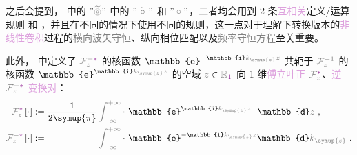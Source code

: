 之后会提到， 中的 $"\mathcolor{gray}{\widetilde \circledcirc}"$ 中的 $"~\mathcolor{gray}{\widetilde \circ}~"$ 和 $"\mathcolor{gray}{\circ}"$，二者均会用到 2 条\textcolor{Plum}{互相关}定义/运算规则  和 ，并且在不同的情况下使用不同的规则，这一点对于理解下转换版本的\textcolor{Plum}{非线性}\textcolor{Plum}{卷积}过程的\textcolor{gray}{横向波矢守恒}、\textcolor{PineGreen}{纵向相位匹配}以及\textcolor{gray}{频率守恒方程}至关重要。

此外， 中定义了 $\mathcolor{gray}{\mathcal F_{z}^{-\mathcolor{Plum}{*}}}$ 的核函数 $\mathbb{e}^{-\mathbb{i}\mathcolor{gray}{k_{\symup{z}}} \mathcolor{gray}{z}}$ 共轭于 $\mathcolor{gray}{\mathcal F_{z}^{-1}}$ 的核函数 $\mathbb{e}^{\mathbb{i}\mathcolor{gray}{k_{\symup{z}}} \mathcolor{gray}{z}}$ 的空域 $\mathcolor{gray}{z} \in \mathcolor{gray}{\bar{\mathbb{R}}_{\textcolor{Plum}{1}}}$ 向 1 维\textcolor{Plum}{傅立叶正} $\mathcolor{gray}{\mathcal F_{z}^{\mathcolor{Plum}{*}}}$、\textcolor{Plum}{逆} $\mathcolor{gray}{\mathcal F_{z}^{-\mathcolor{Plum}{*}}}$ \textcolor{Plum}{变换对}：
\begin{subequations} \label{eq:FT*-z_kz}
\begin{align}
	\mathcolor{gray}{\mathcal F_{z}^{\mathcolor{Plum}{*}}} \left[ \cdot \right] &:= \frac{ 1 }{ 2\symup{\pi} } \mathcolor{gray}{\int_{-\infty}^{+\infty}} \cdot~ \mathbb{e}^{\mathbb{i}\mathcolor{gray}{k_{\symup{z}}} \mathcolor{gray}{z}} \hphantom{^-} \mathbb{d}\mathcolor{gray}{z} ~, \label{eq:FT*-kz} \\
	\mathcolor{gray}{\mathcal F_{z}^{-\mathcolor{Plum}{*}}} \left[ \cdot \right] &:= \hphantom{\frac{ 1 }{ 2\symup{\pi} }} \mathcolor{gray}{\int_{-\infty}^{+\infty}} \cdot~ \mathbb{e}^{-\mathbb{i}\mathcolor{gray}{k_{\symup{z}}} \mathcolor{gray}{z}} \mathbb{d}\mathcolor{gray}{k_{\symup{z}}} ~. \label{eq:IFT*-z}
\end{align}
\end{subequations}

